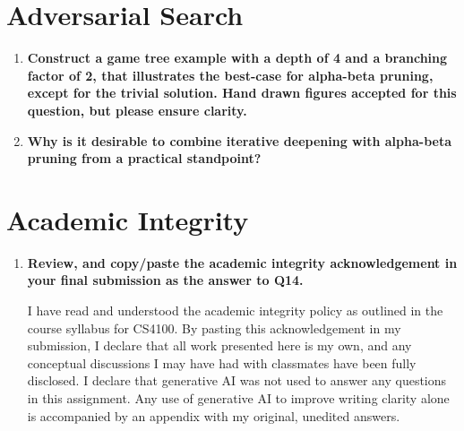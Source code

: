 \documentclass[a4paper]{article}
\begin{document}
\begin{sloppypar}
\begin{enumerate}[start=9,label=Q\arabic*,left=0pt]
\end{enumerate}

\section{Adversarial Search}

\begin{enumerate}[start=12,label=Q\arabic*,left=0pt]
    \item \textbf{Construct a game tree example with a depth of 4 and a branching factor of 2, that illustrates the best-case for alpha-beta pruning, except for the trivial solution. Hand drawn figures accepted for this question, but please ensure clarity.}
    \item \textbf{Why is it desirable to combine iterative deepening with alpha-beta pruning from a practical standpoint?}

\end{enumerate}

\section{Academic Integrity}

\begin{enumerate}[start=14,label=Q\arabic*,left=0pt]
    \item \textbf{Review, and copy/paste the academic integrity acknowledgement in your final submission as the answer to Q14.}
    \par I have read and understood the academic integrity policy as outlined in the course syllabus for CS4100. 
    By pasting this acknowledgement in my submission, I declare that all work presented here is my own, 
    and any conceptual discussions I may have had with classmates have been fully disclosed. I declare that generative AI 
    was not used to answer any questions in this assignment. Any use of generative AI to improve writing clarity 
    alone is accompanied by an appendix with my original, unedited answers.
\end{enumerate}
\end{sloppypar}

\cite{BOOK:1}
\cite{ARTICLE:1}


\end{document}
